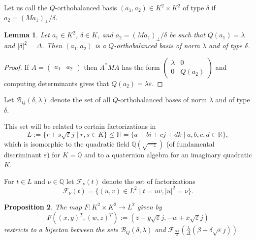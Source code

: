 \documentclass[11pt]{amsart}
\newcommand{\QQ}{\mathbb{Q}}
\newtheorem{proposition}{Proposition}[section]
\newtheorem{lemma}[proposition]{Lemma}
\theoremstyle{definition}
\theoremstyle{remark}
\begin{document}
Let us call the
$Q$-orthobalanced basis $(a_1,a_2)\in K^2\times K^2$ of type $\delta$ if $a_2=(Ma_1)_\perp/\delta$.


\begin{lemma}\label{perpconverse}
Let $a_1\in K^2$, $\delta\in K$, and $a_2=(Ma_1)_\perp/\delta$ be such that $Q(a_1)=\lambda$ and $|\delta|^2=\Delta$. Then $(a_1,a_2)$ is a $Q$-orthobalanced basis of norm $\lambda$ and of type $\delta$.
\end{lemma}
\begin{proof}
If $A=\begin{pmatrix} a_1 & a_2\end{pmatrix}$ then $A^*MA$ has the form $\left(\begin{smallmatrix} \lambda & 0 \\ 0 & Q(a_2)\end{smallmatrix}\right)$ and computing determinants gives that $Q(a_2)=\lambda\varepsilon$. 
\end{proof}



Let $\mathcal B_Q(\delta,\lambda)$ denote the set of all  $Q$-orthobalanced bases of norm $\lambda$ and of type $\delta$.

This set will be related to certain factorizations in 
\begin{equation}\label{Ldef}
L:=\{r+s\sqrt{\varepsilon}j\mid r,s\in K\}\leq \mathbb H=\{a+bi+cj+dk\mid a,b,c,d\in\mathbb R\},
\end{equation}
which is isomorphic to the quadratic field $\QQ(\sqrt{-\varepsilon})$ (of fundamental discriminant $\varepsilon$) for $K=\QQ$ and to a quaternion algebra for an imaginary quadratic $K$.

For $t\in L$ and $\nu\in \mathbb Q$ let $\mathcal F_\nu(t)$ denote the set of factorizations
\[\mathcal F_\nu(t)=\{(u,v)\in L^2\mid t=uv,|u|^2=\nu\}.\]
\begin{proposition}\label{factorizationthm}
The map $F:K^2\times K^2\to L^2$ given by
\[
F((x,y)^T,(w,z)^T):=\left(\overline z+\overline y\sqrt{\varepsilon}j,-w+\overline x\sqrt{\varepsilon}j\right)
\]
restricts to a bijecton between the sets $\mathcal B_Q(\delta,\lambda)$ and $\mathcal F_{\frac{\alpha\lambda}{\Delta}}\left(\frac{\lambda}{\Delta}(\beta+\delta\sqrt{\varepsilon}j)\right)$.
\end{proposition}
\end{document}
